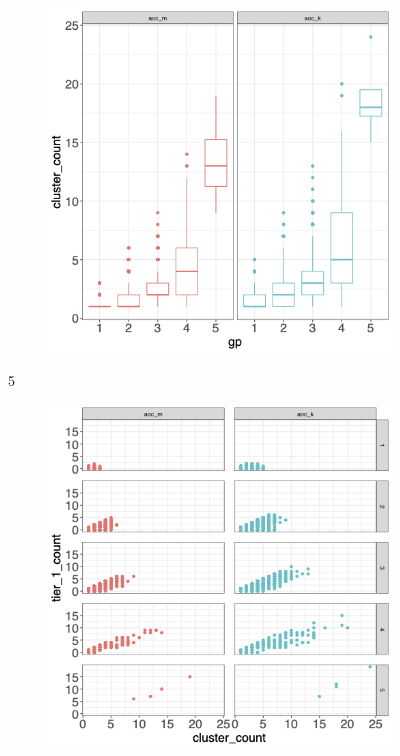 \documentclass[12pt, oneside]{article}   	%
\begin{document}
\begin{figure}[H]
\centering
	\begin{subfigure}[t]{0.48\textwidth}
	 \centering
	 \includegraphics[width=\linewidth]{cluster_group.png} 
	 \end{subfigure}5
 \hfill
	\begin{subfigure}[t]{0.48\textwidth}
        \centering
        \includegraphics[width=\linewidth]{tier_cluster.png} 

\end{subfigure}
\end{figure}
\end{document}
